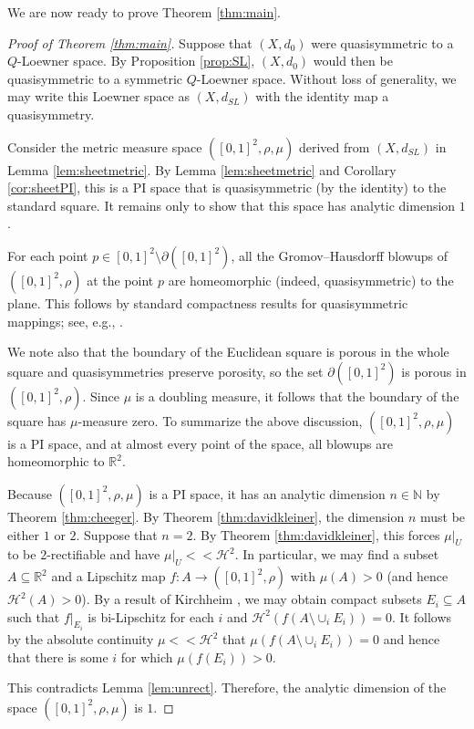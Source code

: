 \documentclass{amsart}
\theoremstyle{plain}
\theoremstyle{definition}
\numberwithin{equation}{section}
\numberwithin{theorem}{section}
\newcommand{\RR}{\mathbb{R}}
\newcommand{\N}{\mathbb{N}}
\begin{document}
We are now ready to prove Theorem \ref{thm:main}.
\begin{proof}[Proof of Theorem \ref{thm:main}]

Suppose that $(X,d_0)$ were quasisymmetric to a $Q$-Loewner space.  By Proposition \ref{prop:SL}, $(X,d_0)$ would then be quasisymmetric to a symmetric $Q$-Loewner space. Without loss of generality, we may write this Loewner space as $(X,d_{SL})$ with the identity map a quasisymmetry.

Consider the metric measure space $([0,1]^2, \rho, \mu)$ derived from $(X,d_{SL})$ in Lemma \ref{lem:sheetmetric}. By Lemma \ref{lem:sheetmetric} and Corollary \ref{cor:sheetPI}, this is a PI space that is quasisymmetric (by the identity) to the standard square. It remains only to show that this space has analytic dimension $1$.

For each point $p\in [0,1]^2 \setminus \partial ([0,1]^2)$, all the Gromov--Hausdorff blowups of $([0,1]^2,\rho)$ at the point $p$ are homeomorphic (indeed, quasisymmetric) to the plane. This follows by standard compactness results for quasisymmetric mappings; see, e.g., \cite[Lemma 2.4.7]{KL}.

We note also that the boundary of the Euclidean square is porous in the whole square and quasisymmetries preserve porosity, so the set $\partial ([0,1]^2)$ is porous in $([0,1]^2,\rho)$. Since $\mu$ is a doubling measure, it follows that the boundary of the square has $\mu$-measure zero. To summarize the above discussion, $([0,1]^2, \rho,\mu)$ is a PI space, and at almost every point of the space, all blowups are homeomorphic to $\mathbb{R}^2$.

Because $([0,1]^2, \rho,\mu)$ is a PI space, it has an analytic dimension $n\in\N$ by Theorem \ref{thm:cheeger}. By Theorem \ref{thm:davidkleiner}, the dimension $n$ must be either $1$ or $2$. Suppose that $n=2$. By Theorem \ref{thm:davidkleiner}, this forces $\mu|_U$ to be $2$-rectifiable and have $\mu|_U << \mathcal{H}^2$. In particular, we may find a subset $A\subseteq \RR^2$ and a Lipschitz map $f\colon A\rightarrow ([0,1]^2,\rho)$ with $\mu(A)>0$ (and hence $\mathcal{H}^2(A)>0$). By a result of Kirchheim \cite[Lemma 4]{Kirchheim}, we may obtain compact subsets $E_i\subseteq A$ such that $f|_{E_i}$ is bi-Lipschitz for each $i$ and $\mathcal{H}^2(f(A\setminus \cup_i E_i)) = 0$. It follows by the absolute continuity $\mu<<\mathcal{H}^2$ that $\mu(f(A\setminus \cup_i E_i))=0$ and hence that there is some $i$ for which $\mu(f(E_i))>0$.

This contradicts Lemma \ref{lem:unrect}. Therefore, the analytic dimension of the space $([0,1]^2, \rho, \mu)$ is $1$.
\end{proof}
\end{document}
